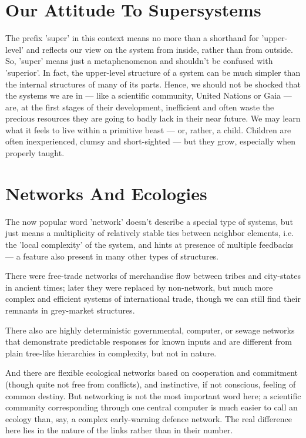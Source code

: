\section{Our Attitude To Supersystems}

     The prefix 'super' in this context means no more than a shorthand
for  'upper-level'  and  reflects  our view on the system from inside,
rather than from outside.  So, 'super' means just a metaphenomenon and
shouldn't  be  confused  with  'superior'.   In  fact, the upper-level
structure of a system can be much simpler than the internal structures
of  many  of  its  parts.   Hence,  we  should not be shocked that the
systems we are in --- like a scientific  community,  United  Nations  or
Gaia  --- are, at the first stages of their development, inefficient and
often waste the precious resources they are going  to  badly  lack  in
their  near  future.   We  may  learn  what  it feels to live within a
primitive  beast  ---  or,  rather,  a  child.    Children   are   often
inexperienced,  clumsy  and  short-sighted --- but they grow, especially
when properly taught.



\section{Networks And Ecologies}

     The now popular word 'network' doesn't describe a special type of
systems,  but  just  means  a  multiplicity  of relatively stable ties
between neighbor elements, i.e.  the 'local complexity' of the system,
and  hints  at presence of multiple feedbacks --- a feature also present
in many other types of structures.

     There were free-trade networks of merchandise flow between tribes
and  city-states  in  ancient  times;  later  they  were  replaced  by
non-network,  but  much  more  complex  and   efficient   systems   of
international  trade,  though  we  can  still  find  their remnants in
grey-market structures.

     There also are highly deterministic  governmental,  computer,  or
sewage  networks  that  demonstrate  predictable  responses  for known
inputs  and  are  different  from  plain  tree-like   hierarchies   in
complexity, but not in nature.

     And there are flexible ecological networks based  on  cooperation
and   commitment   (though   quite   not  free  from  conflicts),  and
instinctive,  if  not  conscious,  feeling  of  common  destiny.   But
networking is not the most important word here; a scientific community
corresponding through one central computer is much easier to  call  an
ecology  than, say, a complex early-warning defence network.  The real
difference here lies in the nature of the links rather than  in  their
number.

